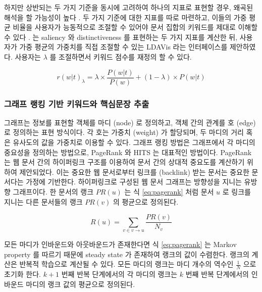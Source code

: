 \documentclass[11pt]{article}
\begin{document}
하지만 상반되는 두 가지 기준을 동시에 고려하여 하나의 지표로 표현할 경우, 왜곡된 해석을 할 가능성이 높다 \citep{chuang2012interpretation}. 
두 가지 기준에 대한 지표를 따로 마련하고, 이들의 가중 평균 비율을 사용자가 능동적으로 조절할 수 있어야 문서 집합의 키워드를 제대로 이해할 수 있다 \citep{chuang2012interpretation}.
\citep{sievert2014ldavis}는 saliency 와 distinctiveness 를 표현하는 두 가지 지표를 계산한 뒤, 사용자가 가중 평균의 가중치를 직접 조절할 수 있는 LDAVis 라는 인터페이스를 제안하였다.
사용자는 $\lambda$ 를 조절하면서 키워드 점수를 재정의 할 수 있다.

\begin{equation}
  \label{eq:ldavis}
  r(w \vert t)_\lambda = \lambda \times \frac{P(w \vert t)}{P(w)} + (1 - \lambda) \times P(w \vert t)
\end{equation}

\subsubsection{그래프 랭킹 기반 키워드와 핵심문장 추출}

그래프는 정보를 표현할 객체를 마디 (node) 로 정의하고, 객체 간의 관계를 호 (edge) 로 정의하는 표현 방식이다.
각 호는 가중치 (weight) 가 할당되며, 두 마디의 거리 혹은 유사도의 값을 가중치로 이용할 수 있다.
그래프 랭킹 방법은 그래프에서 각 마디의 중요성을 정의하는 방법으로, PageRank \citep{ilprints422}와 HITS \citep{kleinberg1999authoritative} 는 대표적인 방법이다.
PageRank 는 웹 문서 간의 하이퍼링크 구조를 이용하여 문서 간의 상대적 중요도를 계산하기 위하여 제안되었다.
이는 중요한 웹 문서로부터 링크를 (backlink) 받는 문서는 중요한 문서다는 가정에 기반한다.
하이퍼링크로 구성된 웹 문서 그래프는 방향성을 지니는 유방향 그래프이다.
한 문서의 랭크 $PR(u)$ 는 식 \ref{eq:pagerank} 처럼 문서 $u$ 로 링크를 지니는 다른 문서들의 랭크 $PR(v)$ 의 평균으로 정의된다.

\begin{equation}
  \label{eq:pagerank}
  R(u) = \sum_{v \in v \rightarrow u} \frac{PR(v)}{N_v}
\end{equation}

모든 마디가 인바운드와 아웃바운드가 존재한다면 식 \ref{eq:pagerank} 는 Markov property 를 따르기 때문에 steady state 가 존재하여 랭크의 값이 수렴한다.
랭크의 계산은 반복적 학습으로 계산될 수 있다.
모든 마디의 랭크는 마디 개수의 역수인 $\frac{1}{N}$ 으로 초기화 한다.
$k+1$ 번째 반복 단계에서의 각 마디의 랭크는 $k$ 번째 반복 단계에서의 인바운드 마디의 랭크 값의 평균으로 정의된다.
\end{document}
